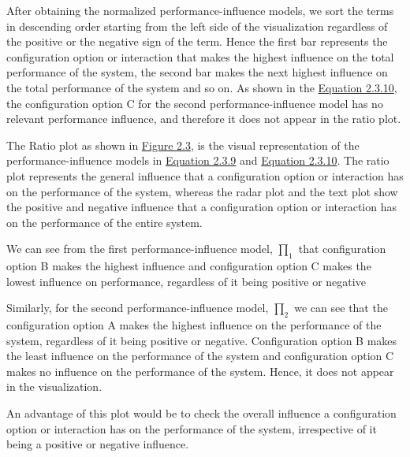 \begin{description}[leftmargin=0pt]
\item[Visualization: ] 
After obtaining the normalized performance-influence models, we sort the terms in descending order starting from the left side of the visualization regardless of the positive or the negative sign of the term. Hence the first bar represents the configuration option or interaction that makes the highest influence on the total performance of the system, the second bar makes the next highest influence on the total performance of the system and so on. As shown in the \hyperref[eq:2.3.10]{Equation 2.3.10}, the configuration option C for the second performance-influence model has no relevant performance influence, and therefore it does not appear in the ratio plot.

The Ratio plot as shown in \hyperref[ratioPlot]{Figure 2.3}, is the visual representation of the performance-influence models in \hyperref[eq:2.3.9]{Equation 2.3.9} and \hyperref[eq:2.3.10]{Equation 2.3.10}. The ratio plot represents the general influence that a configuration option or interaction has on the performance of the system, whereas the radar plot and the text plot show the positive and negative influence that a configuration option or interaction has on the performance of the entire system. 

We can see from the first performance-influence model, $\prod_1$ that configuration option B makes the highest influence and configuration option C makes the lowest influence on performance, regardless of it being positive or negative 

Similarly, for the second performance-influence model, $\prod_2$ we can see that the configuration option A makes the highest influence on the performance of the system, regardless of it being positive or negative. Configuration option B makes the least influence on the performance of the system and configuration option C makes no influence on the performance of the system. Hence, it does not appear in the visualization.

An advantage of this plot would be to check the overall influence a configuration option or interaction has on the performance of the system, irrespective of it being a positive or negative influence.

\end{description}